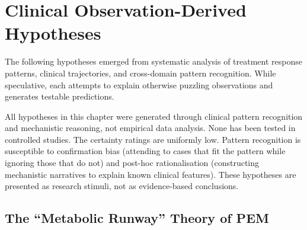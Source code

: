 
\section{Clinical Observation-Derived Hypotheses}
\label{sec:clinical-brainstorm}

The following hypotheses emerged from systematic analysis of treatment response patterns, clinical trajectories, and cross-domain pattern recognition. While speculative, each attempts to explain otherwise puzzling observations and generates testable predictions.

\begin{limitation}
All hypotheses in this chapter were generated through clinical pattern recognition and mechanistic reasoning, not empirical data analysis. None has been tested in controlled studies. The certainty ratings are uniformly low. Pattern recognition is susceptible to confirmation bias (attending to cases that fit the pattern while ignoring those that do not) and post-hoc rationalisation (constructing mechanistic narratives to explain known clinical features). These hypotheses are presented as research stimuli, not as evidence-based conclusions.
\end{limitation}

\subsection{The ``Metabolic Runway'' Theory of PEM}
\label{sec:metabolic-runway}

